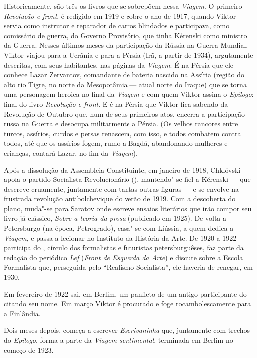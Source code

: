 Historicamente, são três os livros que se sobrepõem nessa \emph{Viagem}.
O primeiro \emph{Revolução e front}, é redigido em 1919 e cobre o ano de
1917, quando Viktor servia como instrutor e reparador de carros
blindados e participava, como comissário de guerra, do Governo
Provisório, que tinha Kérenski como ministro da Guerra. Nesses últimos
meses da participação da Rússia na  Guerra Mundial, Viktor viajou para
a Ucrânia e para a Pérsia (Irã, a partir de 1934), argutamente
descritas, com seus habitantes, nas páginas da \emph{Viagem}. É na
Pérsia que ele conhece Lazar Zervantov, comandante de bateria nascido na
Assíria (região do alto rio Tigre, no norte da Mesopotâmia --- atual
norte do Iraque) que se
torna uma personagem heroica no final da \emph{Viagem} e com quem Viktor
assina o \emph{Epílogo}: final do livro \emph{Revolução e front}. E é na
Pérsia que Viktor fica sabendo da Revolução de Outubro que, num de seus
primeiros atos, encerra a participação russa na  Guerra e desocupa
militarmente a Pérsia. (Os velhos rancores entre turcos, assírios,
curdos e persas renascem, com isso, e todos combatem contra todos, até
que os assírios fogem, rumo a Bagdá, abandonando mulheres e crianças,
contará Lazar, no fim da \emph{Viagem}).

Após a dissolução da Assembleia Constituinte, em janeiro de 1918,
Chklóvski apoia o partido Socialista Revolucionário (), mantendo"-se
fiel a Kérenski --- que descreve cruamente, juntamente com tantas outras
figuras --- e se envolve na frustrada revolução antibolchevique do verão
de 1919. Com a descoberta do plano, muda"-se para Saratov onde escreve
ensaios literários que irão compor seu livro já clássico, \emph{Sobre a
teoria da prosa} (publicado em 1925). De volta a Petersburgo (na época, Petrogrado), casa"-se com Liússia, a quem dedica a \emph{Viagem}, e passa a lecionar no Instituto da História da Arte. De
1920 a 1922 participa do , círculo dos formalistas e futuristas
petersburguêses, faz parte da redação do periódico \emph{Lef}
(\emph{Front de Esquerda da Arte}) e discute sobre a Escola Formalista
que, perseguida pelo ``Realismo Socialista'', ele haveria de renegar,
em 1930.

Em fevereiro de 1922 sai, em Berlim, um panfleto de um antigo
participante do  citando seu nome. Em março Viktor é procurado e
foge rocambolescamente para a Finlândia.

Dois meses depois, começa a escrever \emph{Escrivaninha} que, juntamente
com trechos do \emph{Epílogo}, forma a  parte da \emph{Viagem
sentimental}, terminada em Berlim no começo de 1923.


